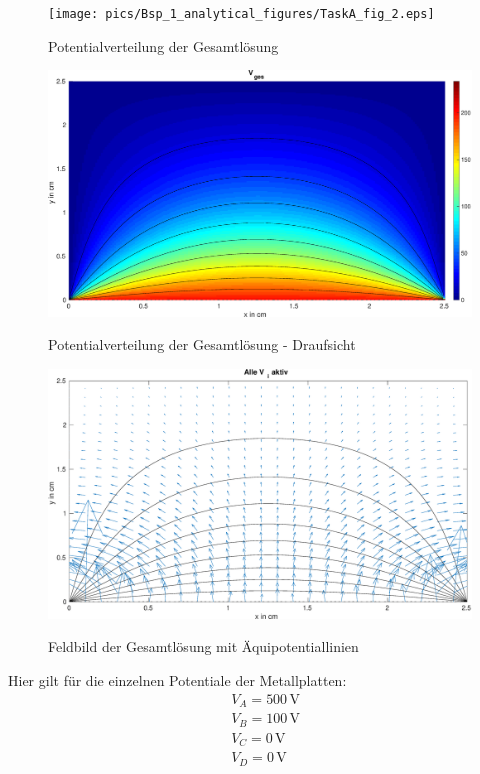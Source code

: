 \begin{figure}[H]
  \centering
  		\texttt{[image: pics/Bsp\_1\_analytical\_figures/TaskA\_fig\_2.eps]}
  \label{fig:Ana:TaskA:Complete}
  \caption{Potentialverteilung der Gesamtlösung}
\end{figure}

\begin{figure}[H]
  \centering
  		\includegraphics[width=1.0\textwidth]{pics/Bsp_1_analytical_figures/TaskA_fig_4.eps}
  \label{fig:Ana:TaskA:CompleteRot}
  \caption{Potentialverteilung der Gesamtlösung - Draufsicht}
\end{figure}

\begin{figure}[H]
  \centering
  		\includegraphics[width=1.0\textwidth]{pics/Bsp_1_analytical_figures/TaskA_fig_6.eps}
  \label{fig:Ana:TaskA:Field:Complete}
  \caption{Feldbild der Gesamtlösung mit Äquipotentiallinien}
\end{figure}


Hier gilt für die einzelnen Potentiale der Metallplatten:
\begin{align*}
	&V_A = 500\,\mathrm{V} \\
	&V_B = 100\,\mathrm{V} \\
	&V_C = 0\,\mathrm{V} \\
	&V_D = 0\,\mathrm{V}
\end{align*}


